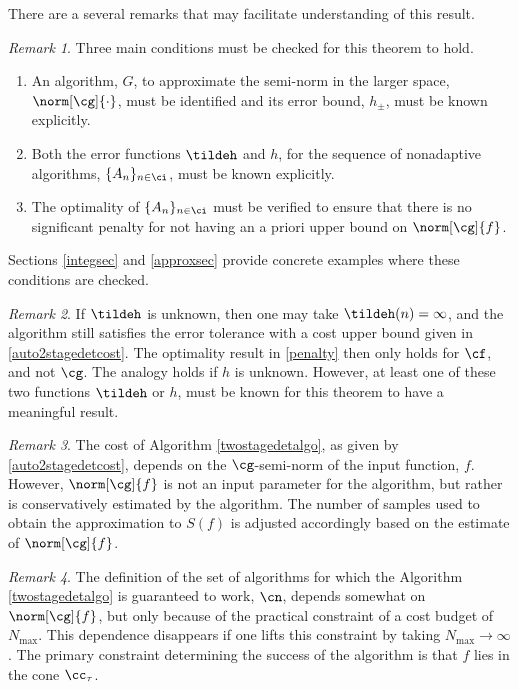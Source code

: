 \documentclass[]{elsarticle}
\theoremstyle{definition}
\theoremstyle{remark}
\newtheorem{rem}{Remark}
\begin{document}
There are a several remarks that may facilitate understanding of this result.

\begin{rem} Three main conditions must be checked for this theorem to hold.
\begin{enumerate}
\renewcommand{\labelenumi}{\roman{enumi}.}
\item An algorithm, $G$, to approximate the semi-norm in the larger space,  $\norm[\cg]{\cdot}$,  must be identified and its error bound, $h_{\pm}$, must be known explicitly.
\item Both the error functions $\tildeh$ and $h$, for the sequence of nonadaptive algorithms, $\{A_n\}_{n \in \ci}$, must be known explicitly.  
\item The optimality of $\{A_n\}_{n \in \ci}$ must be verified to ensure that there is no significant penalty for not having an a priori upper bound on $\norm[\cg]{f}$.
\end{enumerate}
Sections \ref{integsec} and \ref{approxsec} provide concrete examples where these conditions are checked.
\end{rem}

\begin{rem} If $\tildeh$ is unknown, then one may take $\tildeh(n)=\infty$, and the algorithm still satisfies the error tolerance with a cost upper bound given in \eqref{auto2stagedetcost}.  The optimality result in \eqref{penalty} then only holds for $\cf$, and not $\cg$.  The analogy holds if $h$ is unknown.  However, at least one of these two functions $\tildeh$ or $h$, must be known for this theorem to have a meaningful result.
\end{rem}

\begin{rem} The cost of Algorithm \ref{twostagedetalgo}, as given by \eqref{auto2stagedetcost}, depends on the $\cg$-semi-norm of the input function, $f$.  However, $\norm[\cg]{f}$ is not an input parameter for the algorithm, but rather is  conservatively estimated by the algorithm.  The number of samples used to obtain the approximation to $S(f)$ is adjusted accordingly based on the estimate of $\norm[\cg]{f}$.
\end{rem}

\begin{rem}
The definition of the set of algorithms for which the Algorithm \ref{twostagedetalgo} is guaranteed to work, $\cn$, depends somewhat on $\norm[\cg]{f}$, but only because of the practical constraint of a cost budget of $N_{\max}$.  This dependence disappears if one lifts this constraint by taking $N_{\max} \to \infty$.  The primary constraint determining the success of the algorithm is that $f$ lies in the cone $\cc_{\tau}$.
\end{rem}
\end{document}

